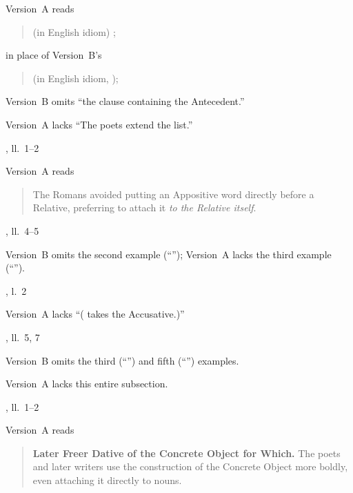 \begin{variations}
\item[{\xref[3]{284}}]

Version~A reads
\begin{quote}
(in English idiom) ;
\end{quote}
in place of Version~B's
\begin{quote}
 (in English idiom,
);
\end{quote}

\item[{\xref[6]{284}}]

Version~B omits “the clause containing the Antecedent.”

\item[{\xref[\emph{c}]{295}}]

Version~A lacks “The poets extend the list.”

\item[{\xref{327}, ll.~1–2}]

Version~A reads
\begin{quote}
The Romans avoided putting an Appositive word directly before a
Relative, preferring to attach it \emph{to the Relative itself}.
\end{quote}

\item[{\xref[\emph{c}]{346}, ll.~4–5}]

Version~B omits the second example (“”);
Version~A lacks the third example (“”).

\item[{\xref[\emph{a}, 2]{352}, l.~2}]

Version~A lacks “( takes the Accusative.)”

\item[{\xref[\emph{c}]{354}, ll.~5, 7}]

Version~B omits the third (“”) and fifth
(“”) examples.

\item[{\xref[\emph{d}]{354}}]

Version~A lacks this entire subsection.

\item[{\xref[\emph{a}]{361}, ll.~1–2}]

Version~A reads
\begin{quote}
\textbf{Later Freer Dative of the Concrete Object for Which.}  The
poets and later writers use the construction of the Concrete Object
more boldly, even attaching it directly to nouns.
\end{quote}


\end{variations}
